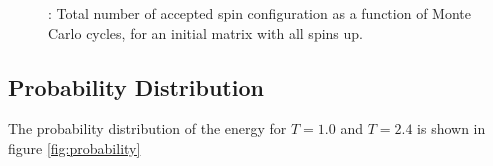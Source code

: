 \documentclass{article}
\begin{document}
{{		\begin{figure}[H]
		\caption{: Total number of accepted spin configuration as a function of Monte Carlo cycles, for an initial matrix with all spins up. }
		\label{fig:flips_random}
		\end{figure}

	\subsection{Probability Distribution}
		The probability distribution of the energy for $T = 1.0$ and $T = 2.4$ is shown in figure \ref{fig:probability}

}}
\end{document}
